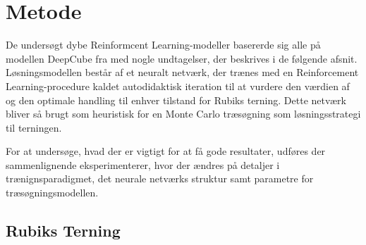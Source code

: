 \documentclass[../main.tex]{subfiles}
\begin{document}
\chapter{Metode}
De undersøgt dybe Reinformcent Learning-modeller basererde sig alle på modellen DeepCube fra \cite{HumansBeGone} med nogle undtagelser, der beskrives i de følgende afsnit. Løsningsmodellen består af et neuralt netværk, der trænes med en Reinforcement Learning-procedure kaldet autodidaktisk iteration til at vurdere den værdien af og den optimale handling til enhver tilstand for Rubiks terning. Dette netværk bliver så brugt som heuristisk for en Monte Carlo træsøgning som løsningsstrategi til terningen.

For at undersøge, hvad der er vigtigt for at få gode resultater, udføres der sammenlignende eksperimenterer, hvor der ændres på detaljer i trænignsparadigmet, det neurale netværks struktur samt parametre for træsøgningsmodellen.
\section{Rubiks Terning}\label{sec:environment}
\end{document}

